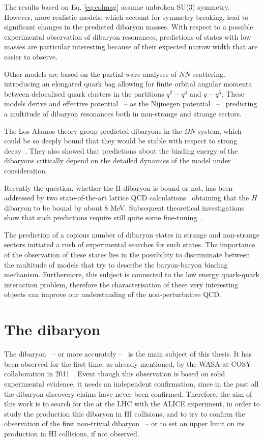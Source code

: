 The results based on Eq. \eqref{eq:colmag} assume unbroken SU(3) symmetry.
However, more realistic models, which account for symmetry breaking, lead to significant changes
in the predicted dibaryon masses.
With respect to a possible experimental observation of dibaryon resonances, predictions of states
with low masses are particular interesting because of their expected narrow width that are easier
to observe.

Other models are based on the partial-wave analyses of $NN$ scattering.
introducing an elongated quark bag allowing for finite orbital angular momenta between
delocalised quark clusters in the partitions $q^{2}-q^{4}$ and $q-q^{5}$. 
These models derive and effective potential \ -- as the Nijmegen 
potential~\cite{dibpred1,dibpred2,dibpred3} -- \ predicting a multitude of dibaryon resonances
both in non-strange and strange sectors. 

The Los Alamos theory group predicted dibaryons in the $\Omega N$ system, which could be so
deeply bound that they would be stable with respect to strong 
decay~\cite{dsinevitable1,dsinevitable2}.
They also showed that predictions about the binding energy of the dibaryons critically depend
on the detailed dynamics of the model under consideration.

Recently the question, whether the H dibaryon is bound or not, has been addressed by two 
state-of-the-art lattice QCD calculations~\cite{Hlattice1,Hlattice2} obtaining
that the $H$ dibaryon to be bound by about 8 MeV.
Subsequent theoretical investigations show that such predictions require still quite some
fine-tuning~\cite{Hlattice3}.

The prediction of a copious number of dibaryon states in strange and non-strange sectors 
initiated a rush of experimental searches for such states. 
The importance of the observation of these states lies in the possibility to discriminate
between the multitude of models that try to describe the baryon-baryon binding mechanism.
Furthermore, this subject is connected to the low energy quark-quark interaction problem,
therefore the characterisation of these very interesting objects can improve our 
understanding of the non-perturbative QCD.

%
%
\section{The \dst dibaryon} \label{sec:2.2}

The \ds dibaryon \ -- or more accurately \dst -- \ is the main subject of this thesis.
It has been observed for the first time, as already mentioned, by the WASA-at-COSY 
collaboration in 2011~\cite{wasa1}.
Event though this observation is based on solid experimental evidence, it needs an independent
confirmation, since in the past all the dibaryon discovery claims have never been confirmed.
Therefore, the aim of this work is to search for the \dst at the LHC with the ALICE
experiment, in order to study the production this dibaryon in HI collisions, and to
try to confirm the observation of the first non-trivial dibaryon \ -- or to set an
upper limit on its production in HI collisions, if not observed.

